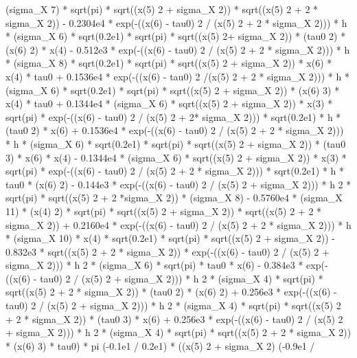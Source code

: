 \begin{maplegroup}
(sigma\_X  7) * sqrt(pi) * sqrt((x(5)  2 + sigma\_X  2)) * sqrt((x(5)  2 + 2 * sigma\_X  2)) - 0.2304e4 * exp(-((x(6) - tau0)  2 / (x(5)  2 + 2 * sigma\_X  2))) * h * (sigma\_X  6) * sqrt(0.2e1) * sqrt(pi) * sqrt((x(5)  2+ sigma\_X  2)) * (tau0  2) * (x(6)  2) * x(4) - 0.512e3 * exp(-((x(6) - tau0)  2 / (x(5)  2 + 2 * sigma\_X  2))) * h * (sigma\_X  8) * sqrt(0.2e1) * sqrt(pi) * sqrt((x(5)  2 + sigma\_X  2)) * x(6) * x(4) * tau0 + 0.1536e4 * exp(-((x(6) - tau0)  2 /(x(5)  2 + 2 * sigma\_X  2))) * h * (sigma\_X  6) * sqrt(0.2e1) * sqrt(pi) * sqrt((x(5)  2 + sigma\_X  2)) * (x(6)  3) * x(4) * tau0 + 0.1344e4 * (sigma\_X  6) * sqrt((x(5)  2 + sigma\_X  2)) * x(3) * sqrt(pi) * exp(-((x(6) - tau0)  2 / (x(5)  2 + 2* sigma\_X  2))) * sqrt(0.2e1) * h * (tau0  2) * x(6) + 0.1536e4 * exp(-((x(6) - tau0)  2 / (x(5)  2 + 2 * sigma\_X  2))) * h * (sigma\_X  6) * sqrt(0.2e1) * sqrt(pi) * sqrt((x(5)  2 + sigma\_X  2)) * (tau0  3) * x(6) * x(4) - 0.1344e4 * (sigma\_X  6) * sqrt((x(5)  2 + sigma\_X  2)) * x(3) * sqrt(pi) * exp(-((x(6) - tau0)  2 / (x(5)  2 + 2 * sigma\_X  2))) * sqrt(0.2e1) * h * tau0 * (x(6)  2) - 0.144e3 * exp(-((x(6) - tau0)  2 / (x(5)  2 + sigma\_X  2))) * h  2 * sqrt(pi) * sqrt((x(5)  2 + 2 *sigma\_X  2)) * (sigma\_X  8) - 0.5760e4 * (sigma\_X  11) * (x(4)  2) * sqrt(pi) * sqrt((x(5)  2 + sigma\_X  2)) * sqrt((x(5)  2 + 2 * sigma\_X  2)) + 0.2160e4 * exp(-((x(6) - tau0)  2 / (x(5)  2 + 2 * sigma\_X  2))) * h * (sigma\_X  10) * x(4) * sqrt(0.2e1) * sqrt(pi) * sqrt((x(5)  2 + sigma\_X  2)) - 0.832e3 * sqrt((x(5)  2 + 2 * sigma\_X  2)) * exp(-((x(6) - tau0)  2 / (x(5)  2 + sigma\_X  2))) * h  2 * (sigma\_X  6) * sqrt(pi) * tau0 * x(6) - 0.384e3 * exp(-((x(6) - tau0)  2 / (x(5)  2 + sigma\_X  2))) * h  2 * (sigma\_X  4) * sqrt(pi) * sqrt((x(5)  2 + 2 * sigma\_X  2)) * (tau0  2) * (x(6)  2) + 0.256e3 * exp(-((x(6) - tau0)  2 / (x(5)  2 + sigma\_X  2))) * h  2 * (sigma\_X  4) * sqrt(pi) * sqrt((x(5)  2 + 2 * sigma\_X  2)) * (tau0 3) * x(6) + 0.256e3 * exp(-((x(6) - tau0)  2 / (x(5)  2 + sigma\_X  2))) * h  2 * (sigma\_X  4) * sqrt(pi) * sqrt((x(5)  2 + 2 * sigma\_X  2)) * (x(6)  3) * tau0) * pi  (-0.1e1 / 0.2e1) * ((x(5)  2 + sigma\_X  2)  (-0.9e1 / 
\end{maplegroup}
